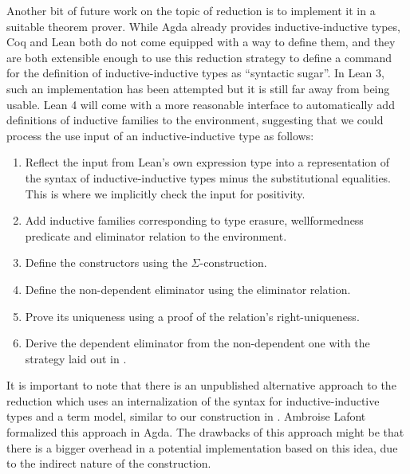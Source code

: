 \begin{remark}
Another bit of future work on the topic of reduction is to implement it in a suitable
theorem prover.
While Agda already provides inductive-inductive types, Coq and Lean both
do not come equipped with a way to define them, and they are both extensible
enough to use this reduction strategy to define a command for the
definition of inductive-inductive types as ``syntactic sugar''.
In Lean 3, such an implementation has been attempted but it is still far away
from being usable.
Lean 4 will come with a more reasonable interface to automatically add definitions
of inductive families to the environment, suggesting that we could process
the use input of an inductive-inductive type as follows:
\begin{enumerate}
\item Reflect the input from Lean's own expression type  into
a representation of the syntax of inductive-inductive types minus the
substitutional equalities.
This is where we implicitly check the input for positivity.
\item Add inductive families corresponding to type erasure, wellformedness
predicate and eliminator relation to the environment.
\item Define the constructors using the $\Sigma$-construction.
\item Define the non-dependent eliminator using the eliminator relation.
\item Prove its uniqueness using a proof of the relation's right-uniqueness.
\item Derive the dependent eliminator from the non-dependent one with the
strategy laid out in \citep{constructingqiits}.
\end{enumerate}
\end{remark}

\begin{remark}
It is important to note that there is an unpublished alternative approach to the
reduction which uses an internalization of the syntax for inductive-inductive types
and a term model, similar to our construction in .
Ambroise Lafont formalized this approach in Agda.
The drawbacks of this approach might be that there is a bigger overhead
in a potential implementation based on this idea,
due to the indirect nature of the construction.
\end{remark}
















